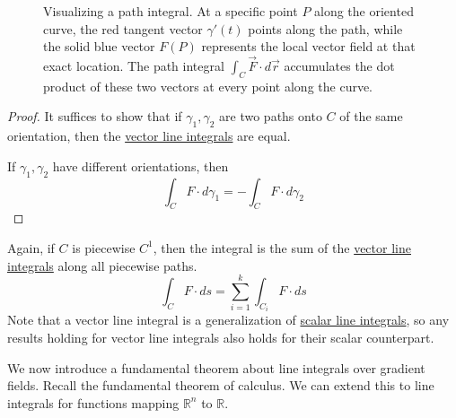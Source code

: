 \begin{definition}
\begin{figure}[H]
			\caption{Visualizing a path integral. At a specific point $P$ along the oriented curve, the red tangent vector $\gamma'(t)$ points along the path, while the solid blue vector $F(P)$ represents the local vector field at that exact location. The path integral $\int_C \vec{F} \cdot d\vec{r}$ accumulates the dot product of these two vectors at every point along the curve.}
			\label{fig:vector_field_tangent}
		\end{figure}
  \end{definition}
	\begin{proof}
	  It suffices to show that if $\gamma_1, \gamma_2$ are two paths onto $C$ of the same orientation, then the \hyperref[def:vector-line-integral]{vector line integrals} are equal. 
		
		If $\gamma_1, \gamma_2$ have different orientations, then 
		\begin{equation}
			\int_C F \cdot d\gamma_1 = - \int_C F \cdot d\gamma_2
		\end{equation}
	\end{proof}
		
	Again, if $C$ is piecewise $C^1$, then the integral is the sum of the \hyperref[def:vector-line-integral]{vector line integrals} along all piecewise paths. 
	\begin{equation}
		\int_C F \cdot d s = \sum_{i = 1}^k \int_{C_i} F \cdot d s
	\end{equation}
	Note that a vector line integral is a generalization of \hyperref[def:scalar-line-integral]{scalar line integrals}, so any results holding for vector line integrals also holds for their scalar counterpart. 
		
  We now introduce a fundamental theorem about line integrals over gradient fields. Recall the fundamental theorem of calculus. We can extend this to line integrals for functions mapping $\mathbb{R}^n$ to $\mathbb{R}$. 
		
